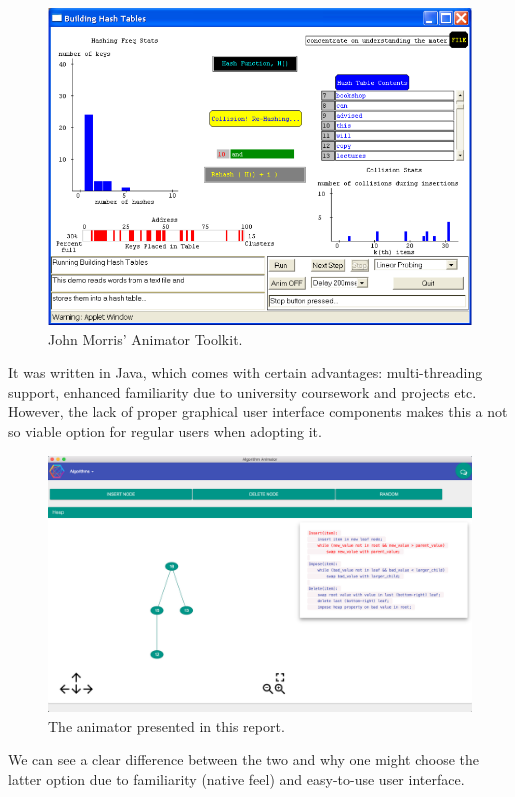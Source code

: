 \documentclass{l4proj}
\begin{document}
\begin{figure}[!ht]
\centering
\includegraphics[scale=0.8]{animator-toolkit}
\caption{John Morris' Animator Toolkit.}
\label{fig:animator-toolkit}
\end{figure}

It was written in Java, which comes with certain advantages: multi-threading support, enhanced familiarity due to university coursework and projects etc. However, the lack of proper graphical user interface components makes this a not so viable option for regular users when adopting it.


\begin{figure}[!ht]
\centering
\includegraphics[scale=0.3]{algo-animator}
\caption{The animator presented in this report.}
\label{fig:palgo}
\end{figure}

We can see a clear difference between the two and why one might choose the latter option due to familiarity (native feel) and easy-to-use user interface.
\end{document}
